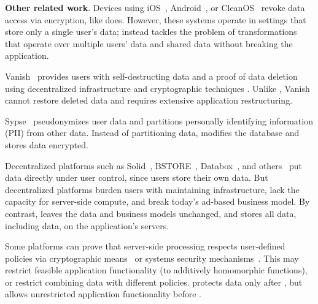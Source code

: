 
%

\textbf{Other related work}.
%
%
{Devices} using iOS~\cite{applesecurity},
Android~\cite{applesecurity}, or CleanOS~\cite{cleanos} revoke
data access via encryption, like \sys does.
%
However, these systems operate in settings that store only a single user's data;
\sys instead tackles the problem of
transformations that operate over multiple users' data and shared data without
breaking the application.
%

%
Vanish~\cite{vanish} provides users with self-destructing data and a {proof of
data deletion} using decentralized infrastructure and cryptographic techniques
. Unlike
\sys, Vanish cannot restore deleted data and requires extensive application
restructuring.
%

%
{Sypse~\cite{sypse}} pseudonymizes user data and partitions
personally identifying information (PII) from other data. Instead of
partitioning data, \sys modifies the database and stores \xxed data
encrypted.
%

{Decentralized platforms} such as Solid~\cite{solid}, BSTORE~\cite{bstore},
Databox~\cite{databox}, and others~\cite{diy, amber, oort, w5, blockstack} put
data directly under user control, since users store their own data.
%
But decentralized platforms burden users with maintaining infrastructure, lack
the capacity for server-side compute, and break today's ad-based
business model.
%
By contrast, \sys leaves the data and business models unchanged,
and stores all data, including \xxed data, on the application's servers.
%

Some platforms can prove that server-side processing respects
{user-defined policies} via cryptographic means~\cite{zeph} or
systems security mechanisms~\cite{riverbed}. This may restrict feasible
application functionality (\eg to additively homomorphic functions), or restrict
combining data with different policies. \sys protects data only after
\xxing, but allows unrestricted application functionality before
\xxing.

